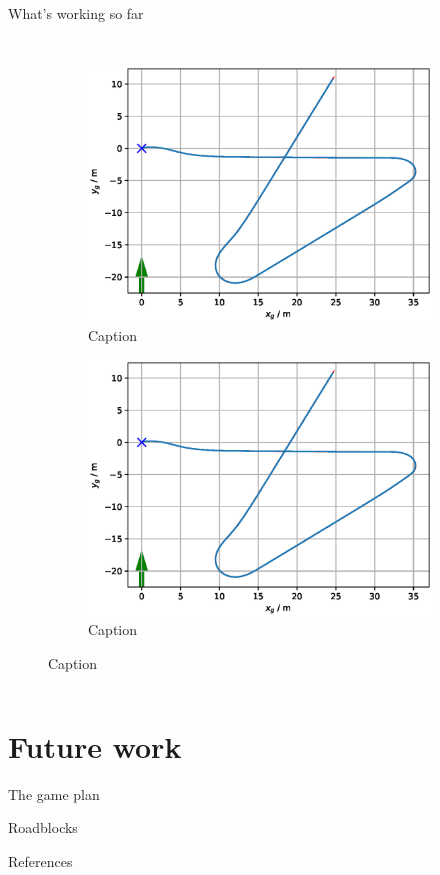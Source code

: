 \documentclass[10pt,xcolor={table,dvipsnames},t]{beamer}
\begin{document}
\begin{frame}{What's working so far}
\begin{columns}
    \begin{figure}
        \centering
        \begin{subfigure}
            \centering
            \includegraphics{documents/figures/trajectories.eps}
            \caption{Caption}
            \label{fig:my_label}
        \end{subfigure}
        \begin{subfigure}
            \centering
            \includegraphics{documents/figures/trajectories.eps}
            \caption{Caption}
            \label{fig:my_label}
        \end{subfigure}
    \end{figure}
\end{columns}

\end{frame}


\section{Future work}

\begin{frame}{The game plan}

\end{frame}
\begin{frame}{Roadblocks}
    
\end{frame}
\begin{frame}{References}
    \printbibliography{}
\end{frame}
\end{document}
